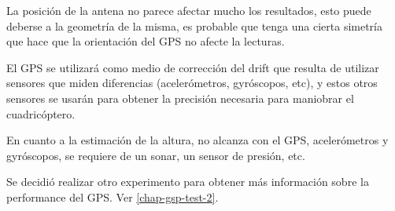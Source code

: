 \documentclass[spanish,12pt,a4paper,titlepage]{report}
\begin{document}
La posición de la antena no parece afectar mucho los resultados, esto puede deberse a la geometría de la misma, es probable que tenga una cierta simetría que hace que la orientación del GPS no afecte la lecturas.

El GPS se utilizará como medio de corrección del drift que resulta de utilizar sensores que miden diferencias (acelerómetros, gyróscopos, etc), y estos otros sensores se usarán para obtener la precisión necesaria para maniobrar el cuadricóptero.

En cuanto a la estimación de la altura, no alcanza con el GPS, acelerómetros y gyróscopos, se requiere de un sonar, un sensor de presión, etc.

Se decidió realizar otro experimento para obtener más información sobre la performance del GPS. Ver \ref{chap-gsp-test-2}.
\end{document}
